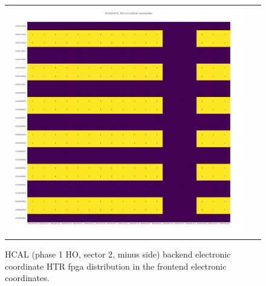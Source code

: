 \begin{figure}[htb]
 \begin{center}
  \begin{tabular}{cc}
   \includegraphics[angle=0,width=0.95\textwidth]{figures/appendix/HO2M_HTR_TB_in_FrontEnd.png}
  \end{tabular}
  \caption{HCAL (phase 1 HO, sector 2, minus side) backend electronic coordinate HTR fpga distribution in the frontend electronic coordinates.}
  \label{fig:lmapHO2MHTRTBFEC}
 \end{center}
\end{figure}
\clearpage

